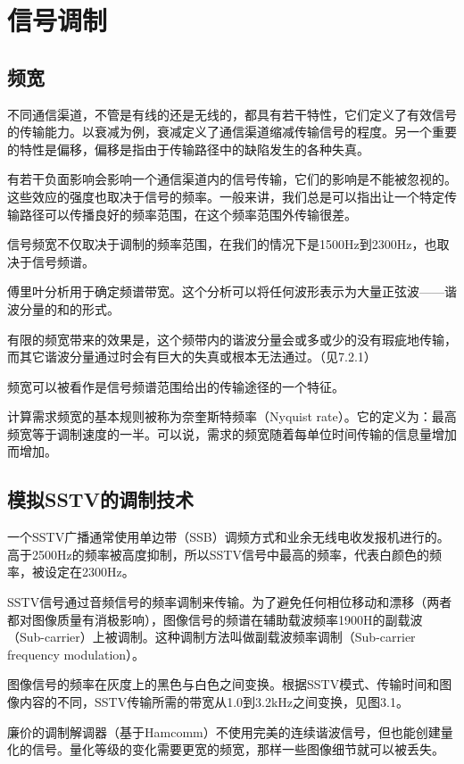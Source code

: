 \section{信号调制}

\subsection{频宽}

不同通信渠道，不管是有线的还是无线的，都具有若干特性，它们定义了有效信号的传输能力。以衰减为例，衰减定义了通信渠道缩减传输信号的程度。另一个重要的特性是偏移，偏移是指由于传输路径中的缺陷发生的各种失真。

有若干负面影响会影响一个通信渠道内的信号传输，它们的影响是不能被忽视的。这些效应的强度也取决于信号的频率。一般来讲，我们总是可以指出让一个特定传输路径可以传播良好的频率范围，在这个频率范围外传输很差。

信号频宽不仅取决于调制的频率范围，在我们的情况下是1500Hz到2300Hz，也取决于信号频谱。

傅里叶分析用于确定频谱带宽。这个分析可以将任何波形表示为大量正弦波——谐波分量的和的形式。

有限的频宽带来的效果是，这个频带内的谐波分量会或多或少的没有瑕疵地传输，而其它谐波分量通过时会有巨大的失真或根本无法通过。（见7.2.1）

频宽可以被看作是信号频谱范围给出的传输途径的一个特征。

计算需求频宽的基本规则被称为奈奎斯特频率（Nyquist rate）。它的定义为：最高频宽等于调制速度的一半。可以说，需求的频宽随着每单位时间传输的信息量增加而增加。

\subsection{模拟SSTV的调制技术}

一个SSTV广播通常使用单边带（SSB）调频方式和业余无线电收发报机进行的。高于2500Hz的频率被高度抑制，所以SSTV信号中最高的频率，代表白颜色的频率，被设定在2300Hz。

SSTV信号通过音频信号的频率调制来传输。为了避免任何相位移动和漂移（两者都对图像质量有消极影响），图像信号的频谱在辅助载波频率1900H的副载波（Sub-carrier）上被调制。这种调制方法叫做副载波频率调制（Sub-carrier frequency modulation）。

图像信号的频率在灰度上的黑色与白色之间变换。根据SSTV模式、传输时间和图像内容的不同，SSTV传输所需的带宽从1.0到3.2kHz之间变换，见图3.1。

廉价的调制解调器（基于Hamcomm）不使用完美的连续谐波信号，但也能创建量化的信号。量化等级的变化需要更宽的频宽，那样一些图像细节就可以被丢失。

